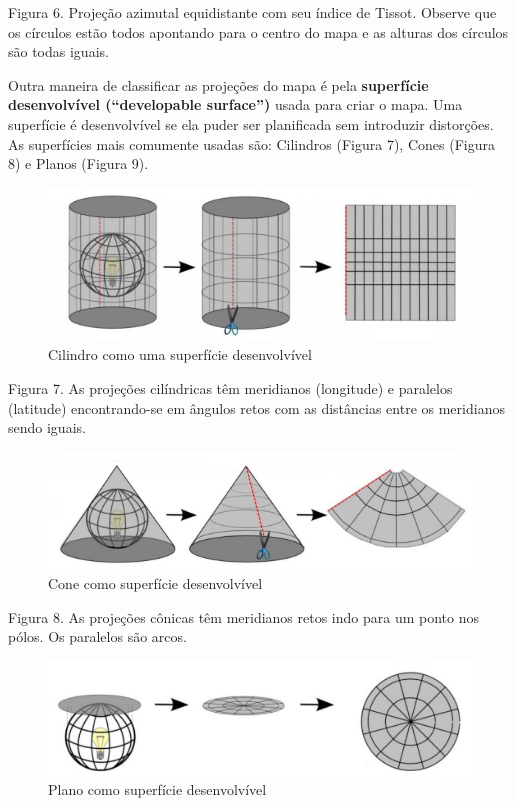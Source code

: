 \documentclass[
  portuguese,
]{krantz}
\begin{document}
Figura 6. Projeção azimutal equidistante com seu índice de Tissot. Observe que os círculos estão todos apontando para o centro do mapa e as alturas dos círculos são todas iguais.

Outra maneira de classificar as projeções do mapa é pela \textbf{superfície desenvolvível (``developable surface'')} usada para criar o mapa. Uma superfície é desenvolvível se ela puder ser planificada sem introduzir distorções. As superfícies mais comumente usadas são: Cilindros (Figura 7), Cones (Figura 8) e Planos (Figura 9).

\begin{figure}
\centering
\includegraphics{media/modulo0/cylinder.png}
\caption{Cilindro como uma superfície desenvolvível}
\end{figure}

Figura 7. As projeções cilíndricas têm meridianos (longitude) e paralelos (latitude) encontrando-se em ângulos retos com as distâncias entre os meridianos sendo iguais.

\begin{figure}
\centering
\includegraphics{media/modulo0/cone.png}
\caption{Cone como superfície desenvolvível}
\end{figure}

Figura 8. As projeções cônicas têm meridianos retos indo para um ponto nos pólos. Os paralelos são arcos.

\begin{figure}
\centering
\includegraphics{media/modulo0/plane.png}
\caption{Plano como superfície desenvolvível}
\end{figure}
\end{document}
